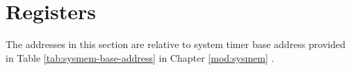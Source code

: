 \documentclass[main\_\_EN.tex]{subfiles}
\begin{document}




\clearpage
\section{Registers}

The addresses in this section are relative to system timer base address provided in Table \ref{tab:sysmem-base-address} in Chapter \ref{mod:sysmem} \textit{}.


\end{document}
